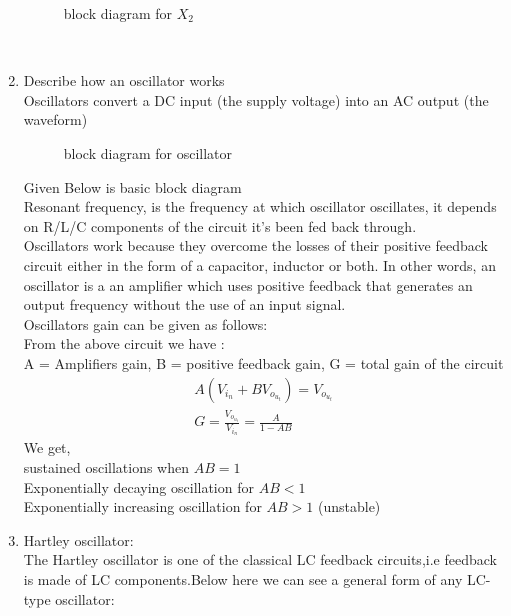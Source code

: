 \begin{enumerate}[label=\thesubsection.\arabic*.,ref=\thesubsection.\theenumi]
\begin{figure}[!ht]
\begin{center}
		\resizebox{\columnwidth}{!}{}
	\end{center}
\caption{block diagram for $X_2$}
\label{fig:block2}
\end{figure}
\\
\item Describe how an oscillator works \\
\solution Oscillators convert a DC input (the supply voltage) into an AC output (the waveform) \\
\begin{figure}[!ht]
    \begin{center}
		
		\resizebox{\columnwidth}{!}{}
	\end{center}
\caption{block diagram for oscillator}
\label{fig:block2}
\end{figure}
Given Below is basic block diagram\\
Resonant frequency, is the frequency at which oscillator oscillates, it depends on R/L/C components of the circuit it's been fed back through.\\
Oscillators work because they overcome the losses of their positive feedback circuit either in the form of a capacitor, inductor or both. In other words, an oscillator is a an amplifier which uses positive feedback that generates an output frequency without the use of an input signal.\\
Oscillators gain can be given as follows:\\
From the above circuit we have :\\
A = Amplifiers gain, B = positive feedback gain, G = total gain of the circuit
\begin{align}
    A(V_i_n + BV_o_u_t) =V_o_u_t \\
    G = \frac{V_o_u_t}{V_i_n} = \frac{A}{1 - AB}
\end{align}
We get,\\
sustained oscillations when $AB = 1$\\
Exponentially decaying oscillation for $AB<1$ \\
Exponentially increasing oscillation for $AB >1$ (unstable)\\
\newline
\item Hartley oscillator:\\
The Hartley oscillator is one of the classical LC feedback circuits,i.e feedback is made of LC components.Below here we can see a general form of any LC-type oscillator:


\end{enumerate}
